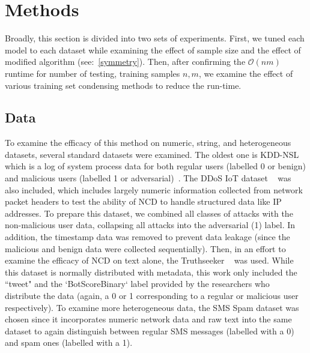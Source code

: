 \documentclass[conference]{IEEEtran}
\begin{document}
\section{Methods}
Broadly, this section is divided into two sets of experiments. First, we tuned each model to each dataset while examining the effect of sample size and the effect of modified algorithm (see:~\ref{symmetry}). Then, after confirming the $\mathcal{O}(nm)$ runtime for number of testing, training samples $n,m$, we examine the effect of various training set condensing methods to reduce the run-time. 


\label{methods}
\subsection{Data}
\label{datasets}
To examine the efficacy of this method on numeric, string, and heterogeneous datasets, several standard datasets were examined. 
The oldest one is KDD-NSL which is a log of system process data for both regular users (labelled 0 or benign) and malicious users (labelled 1 or adversarial)~\cite{kddnsl}. 
The DDoS IoT dataset ~\cite{ddos} was also included, which includes largely numeric information collected from network packet headers to test the ability of NCD to handle structured data like IP addresses. 
To prepare this dataset, we combined all classes of attacks with the non-malicious user data, collapsing all attacks into the adversarial (1) label. 
In addition, the timestamp data was removed to prevent data leakage  (since the malicious and benign data were collected sequentially). 
Then, in an effort to examine the efficacy of NCD on text alone, the Truthseeker ~\cite{truthseeker} was used. 
While this dataset is normally distributed with metadata, this work only included the ``tweet" and the `BotScoreBinary` label provided by the researchers who distribute the data (again, a 0 or 1 corresponding to a regular or malicious user respectively). 
To examine more heterogeneous data, the SMS Spam dataset was chosen since it incorporates numeric network data and raw text into the same dataset to again distinguish between regular SMS messages (labelled with a 0) and spam ones (labelled with a 1). 
\end{document}
